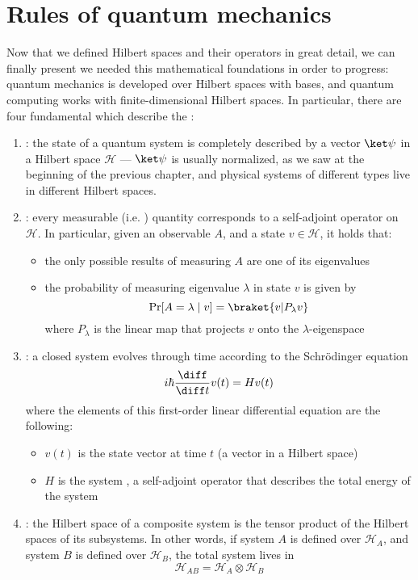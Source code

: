 \documentclass[a4paper, 12pt]{report}
\begin{document}
\section{Rules of quantum mechanics}

Now that we defined Hilbert spaces and their operators in great detail, we can finally present we needed this mathematical foundations in order to progress: quantum mechanics is developed over Hilbert spaces with  bases, and quantum computing works with finite-dimensional Hilbert spaces. In particular, there are four fundamental  which describe the :

\begin{enumerate}
	\item {}: the state of a quantum system is completely described by a vector $\ket \psi$ in a Hilbert space $\mathcal H$ --- $\ket \psi$ is usually normalized, as we saw at the beginning of the previous chapter, and physical systems of different types live in different Hilbert spaces.
	\item {}: every measurable (i.e. ) quantity corresponds to a self-adjoint operator on $\mathcal H$. In particular, given an observable $A$, and a state $v \in \mathcal H$, it holds that:
            \begin{itemize}
                \item the only possible results of measuring $A$ are one of its eigenvalues
                \item the probability of measuring eigenvalue $\lambda$ in state $v$ is given by $$\Pr[A = \lambda \mid v] = \braket{v|P_\lambda v}$$ where $P_\lambda$ is the linear map that projects $v$ onto the $\lambda$-eigenspace
            \end{itemize}
        \item {}: a closed system evolves through time according to the Schrödinger equation $$i \hbar \dfrac{\diff}{\diff t} v(t) = Hv(t)$$ where the elements of this first-order linear differential equation are the following:

            \begin{itemize}
                \item $v(t)$ is the state vector at time $t$ (a vector in a Hilbert space)
                \item $H$ is the system , a self-adjoint operator that describes the total energy of the system
            \end{itemize}
        \item {}: the Hilbert space of a composite system is the tensor product of the Hilbert spaces of its subsystems. In other words, if system $A$ is defined over $\mathcal H_A$, and system $B$ is defined over $\mathcal H_B$, the total system lives in $$\mathcal H_{AB} = \mathcal H_A \otimes \mathcal H_B$$
\end{enumerate}
\end{document}
